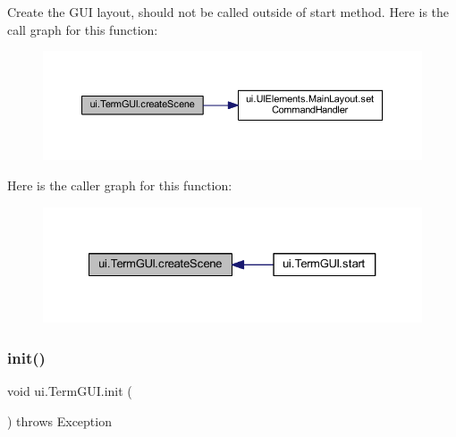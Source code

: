Create the G\+UI layout, should not be called outside of start method. Here is the call graph for this function\+:
\nopagebreak
\begin{figure}[H]
\begin{center}
\leavevmode
\includegraphics[width=350pt]{classui_1_1_term_g_u_i_ab4733b3f54899f4563a298931686cad0_cgraph}
\end{center}
\end{figure}
Here is the caller graph for this function\+:
\nopagebreak
\begin{figure}[H]
\begin{center}
\leavevmode
\includegraphics[width=327pt]{classui_1_1_term_g_u_i_ab4733b3f54899f4563a298931686cad0_icgraph}
\end{center}
\end{figure}
\mbox{\label{classui_1_1_term_g_u_i_a25ee2d1053a7a06f43524b4ffa84161e}} 
\subsubsection{\texorpdfstring{init()}{init()}}
{\footnotesize\ttfamily void ui.\+Term\+G\+U\+I.\+init (\begin{DoxyParamCaption}{ }\end{DoxyParamCaption}) throws Exception\hspace{0.3cm}{\ttfamily [inline]}}

\mbox{\label{classui_1_1_term_g_u_i_a8ef774ab2fe02b2469e7b675ba9c5a4d}} 
